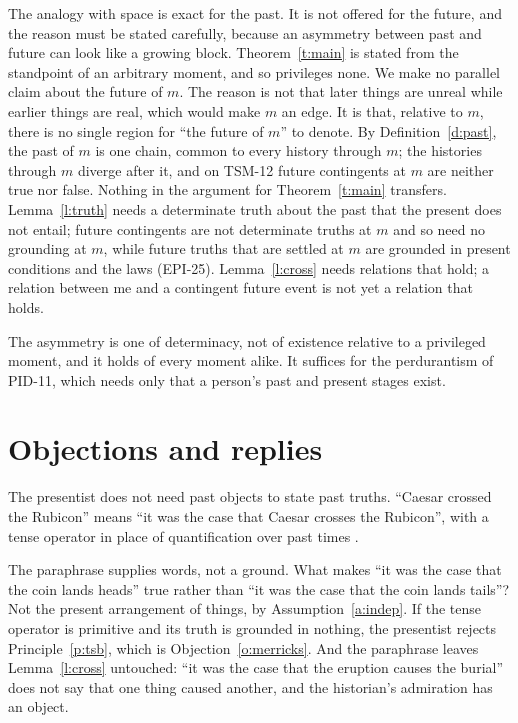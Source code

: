 \documentclass{situationist-preprint}
\begin{document}
The analogy with space is exact for the past. It is not offered for the future, and the reason must be stated carefully, because an asymmetry between past and future can look like a growing block. Theorem~\ref{t:main} is stated from the standpoint of an arbitrary moment, and so privileges none. We make no parallel claim about the future of $m$. The reason is not that later things are unreal while earlier things are real, which would make $m$ an edge. It is that, relative to $m$, there is no single region for \enquote{the future of $m$} to denote. By Definition~\ref{d:past}, the past of $m$ is one chain, common to every history through $m$; the histories through $m$ diverge after it, and on TSM-12 future contingents at $m$ are neither true nor false. Nothing in the argument for Theorem~\ref{t:main} transfers. Lemma~\ref{l:truth} needs a determinate truth about the past that the present does not entail; future contingents are not determinate truths at $m$ and so need no grounding at $m$, while future truths that are settled at $m$ are grounded in present conditions and the laws (EPI-25). Lemma~\ref{l:cross} needs relations that hold; a relation between me and a contingent future event is not yet a relation that holds.

The asymmetry is one of determinacy, not of existence relative to a privileged moment, and it holds of every moment alike. It suffices for the perdurantism of PID-11, which needs only that a person's past and present stages exist.

\section{Objections and replies}

\begin{objection}[Paraphrase]\label{o:para}
The presentist does not need past objects to state past truths. \enquote{Caesar crossed the Rubicon} means \enquote{it was the case that Caesar crosses the Rubicon}, with a tense operator in place of quantification over past times \citep{Prior1970}.
\end{objection}

\begin{reply}
The paraphrase supplies words, not a ground. What makes \enquote{it was the case that the coin lands heads} true rather than \enquote{it was the case that the coin lands tails}? Not the present arrangement of things, by Assumption~\ref{a:indep}. If the tense operator is primitive and its truth is grounded in nothing, the presentist rejects Principle~\ref{p:tsb}, which is Objection~\ref{o:merricks}. And the paraphrase leaves Lemma~\ref{l:cross} untouched: \enquote{it was the case that the eruption causes the burial} does not say that one thing caused another, and the historian's admiration has an object.
\end{reply}
\end{document}
